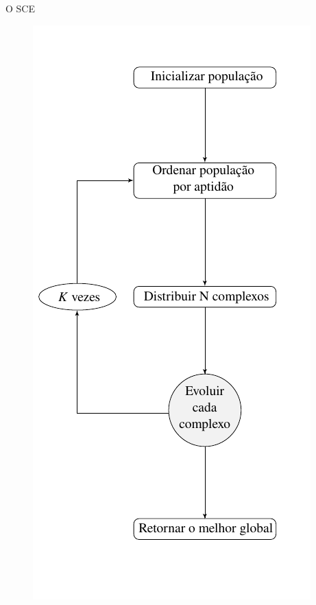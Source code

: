 \documentclass[10pt,xcolor=table,fleqn]{beamer}
\newcommand{\mytitle}[1]{
  \begin{center}
    \color{defblue}
    { \LARGE #1 }
  \end{center}
}
\begin{document}
\begin{frame}
	\mytitle{O SCE}
  \vspace{-5mm}
  \begin{figure}
    \centering
    \hspace{4mm}
    \begin{minipage}[b]{0.36\textwidth}
      \includegraphics[width=\textwidth]{../img/sce/flow1}

\end{minipage}
\end{figure}
\end{frame}
\end{document}
